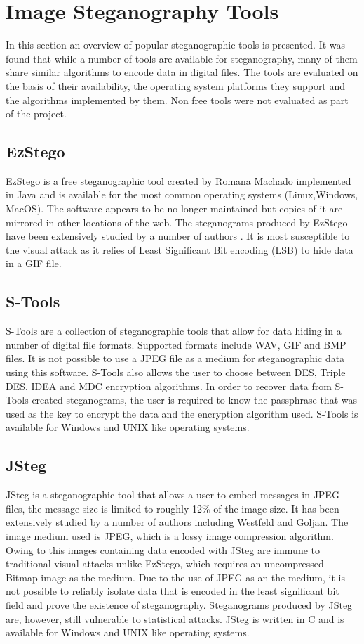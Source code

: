 \section{Image Steganography Tools}
\label{sec:tools}
In this section an overview of popular steganographic tools is presented. It was found that while a number of tools are available for steganography, many of them share similar algorithms to encode data in digital files.  The tools are evaluated on the basis of their availability, the operating system platforms they support and the algorithms implemented by them. Non free tools were not evaluated as part of the project. 
\subsection{EzStego}
EzStego \cite{ezstego} is a free steganographic tool created by Romana Machado  implemented in Java and is available for the most common operating systems (Linux,Windows, MacOS). The software appears to be no longer maintained but copies of it are mirrored in other locations of the web. The steganograms produced by EzStego have been extensively studied by a number of authors  \cite{westfeld2000attacks, farid2002detecting}. It is most susceptible to the visual attack as it relies of Least Significant Bit encoding (LSB) to hide data in a GIF file. 
\subsection{S-Tools}
S-Tools \cite{stools} are a collection of steganographic tools that allow for data hiding in a number of digital file formats. Supported formats include WAV, GIF and BMP files. It is not possible to use a JPEG file as a medium for steganographic data using this software.  S-Tools also allows the user to choose between DES, Triple DES, IDEA and MDC encryption algorithms. In order to recover data from S-Tools created steganograms,  the user is required to know the passphrase that was used as the key to encrypt the data and the encryption algorithm used.  S-Tools is available for Windows and UNIX like operating systems.
\subsection{JSteg} 
JSteg \cite{jsteg} is a steganographic tool that allows a user to embed messages in JPEG files, the message size is limited to roughly 12\% of the image size. It has been extensively studied by a number of authors including Westfeld and Goljan. The image medium used is JPEG, which is a lossy image compression algorithm. Owing to this images containing data encoded with JSteg are immune to traditional visual attacks unlike EzStego, which requires an uncompressed Bitmap image as the medium. Due to the use of JPEG as an the medium, it is not possible to reliably isolate data that is encoded in the least significant bit field and prove the existence of steganography. Steganograms produced by JSteg are, however, still vulnerable to statistical attacks. JSteg is written in C and is available for Windows and UNIX like operating systems.
